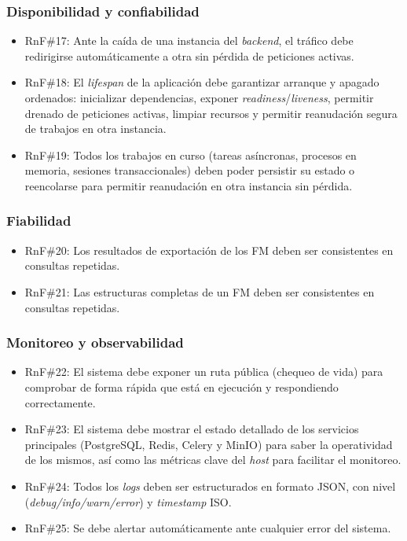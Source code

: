 \subsubsection{Disponibilidad y confiabilidad}

\begin{itemize}
	\item \ac{RnF}\#17: Ante la caída de una instancia del \textit{backend}, el tráfico debe redirigirse automáticamente a otra sin 
			pérdida de peticiones activas.
	\item \ac{RnF}\#18: El \textit{lifespan} de la aplicación debe garantizar arranque y apagado ordenados: inicializar dependencias, exponer \textit{readiness}/\textit{liveness}, permitir drenado de peticiones activas, limpiar recursos y permitir reanudación segura de trabajos en otra instancia. 
	\item \ac{RnF}\#19: Todos los trabajos en curso (tareas asíncronas, procesos en memoria, sesiones transaccionales) deben poder persistir su estado o reencolarse para permitir reanudación en otra instancia sin pérdida.
\end{itemize}

\subsubsection{Fiabilidad}

\begin{itemize}
	\item \ac{RnF}\#20: Los resultados de exportación de los \ac{FM} deben ser consistentes en consultas repetidas.
	\item \ac{RnF}\#21: Las estructuras completas de un \ac{FM} deben ser consistentes en consultas repetidas.
\end{itemize}

\subsubsection{Monitoreo y observabilidad}

\begin{itemize}
	\item \ac{RnF}\#22: El sistema debe exponer un ruta pública (chequeo de vida) para comprobar de forma rápida que está en ejecución y respondiendo correctamente.
	\item \ac{RnF}\#23: El sistema debe mostrar el estado detallado de los servicios principales (PostgreSQL, Redis, Celery y MinIO) para saber la operatividad de los mismos, 
			así como las métricas clave del \textit{host} para facilitar el monitoreo.
	\item \ac{RnF}\#24: Todos los \textit{logs} deben ser estructurados en formato \ac{JSON}, con nivel (\textit{debug/info/warn/error}) y \textit{timestamp} ISO.
	\item \ac{RnF}\#25: Se debe alertar automáticamente ante cualquier error del sistema.	
\end{itemize}

